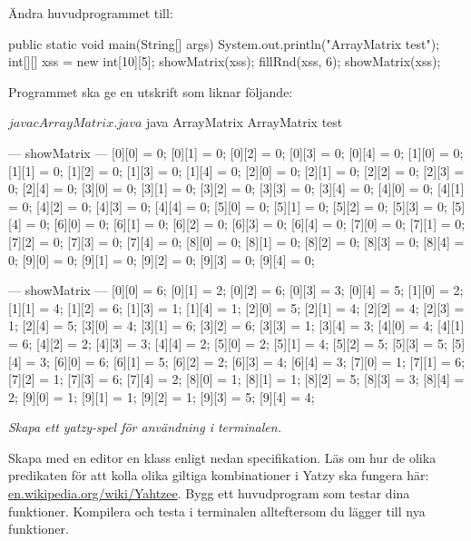 Ändra huvudprogrammet till:
\begin{Code}[language=Java]
    public static void main(String[] args) {
        System.out.println("ArrayMatrix test");
        int[][] xss = new int[10][5];
        showMatrix(xss);
        fillRnd(xss, 6);
        showMatrix(xss);
    }
\end{Code}

Programmet ska ge en utskrift som liknar följande:
\begin{REPL}
$ javac ArrayMatrix.java
$ java ArrayMatrix
ArrayMatrix test

--- showMatrix ---
[0][0] = 0; [0][1] = 0; [0][2] = 0; [0][3] = 0; [0][4] = 0;
[1][0] = 0; [1][1] = 0; [1][2] = 0; [1][3] = 0; [1][4] = 0;
[2][0] = 0; [2][1] = 0; [2][2] = 0; [2][3] = 0; [2][4] = 0;
[3][0] = 0; [3][1] = 0; [3][2] = 0; [3][3] = 0; [3][4] = 0;
[4][0] = 0; [4][1] = 0; [4][2] = 0; [4][3] = 0; [4][4] = 0;
[5][0] = 0; [5][1] = 0; [5][2] = 0; [5][3] = 0; [5][4] = 0;
[6][0] = 0; [6][1] = 0; [6][2] = 0; [6][3] = 0; [6][4] = 0;
[7][0] = 0; [7][1] = 0; [7][2] = 0; [7][3] = 0; [7][4] = 0;
[8][0] = 0; [8][1] = 0; [8][2] = 0; [8][3] = 0; [8][4] = 0;
[9][0] = 0; [9][1] = 0; [9][2] = 0; [9][3] = 0; [9][4] = 0;

--- showMatrix ---
[0][0] = 6; [0][1] = 2; [0][2] = 6; [0][3] = 3; [0][4] = 5;
[1][0] = 2; [1][1] = 4; [1][2] = 6; [1][3] = 1; [1][4] = 1;
[2][0] = 5; [2][1] = 4; [2][2] = 4; [2][3] = 1; [2][4] = 5;
[3][0] = 4; [3][1] = 6; [3][2] = 6; [3][3] = 1; [3][4] = 3;
[4][0] = 4; [4][1] = 6; [4][2] = 2; [4][3] = 3; [4][4] = 2;
[5][0] = 2; [5][1] = 4; [5][2] = 5; [5][3] = 5; [5][4] = 3;
[6][0] = 6; [6][1] = 5; [6][2] = 2; [6][3] = 4; [6][4] = 3;
[7][0] = 1; [7][1] = 6; [7][2] = 1; [7][3] = 6; [7][4] = 2;
[8][0] = 1; [8][1] = 1; [8][2] = 5; [8][3] = 3; [8][4] = 2;
[9][0] = 1; [9][1] = 1; [9][2] = 1; [9][3] = 5; [9][4] = 4;

\end{REPL}





\clearpage


\ExtraTasks %

\Task \emph{Skapa ett yatzy-spel för användning i terminalen.}

\Subtask Skapa med en editor en klass enligt nedan specifikation. Läs om hur de olika predikaten för att kolla olika giltiga kombinationer i Yatzy ska fungera här: \href{https://en.wikipedia.org/wiki/Yahtzee}{en.wikipedia.org/wiki/Yahtzee}. Bygg ett huvudprogram som testar dina funktioner. Kompilera och testa i terminalen allteftersom du lägger till nya funktioner.

